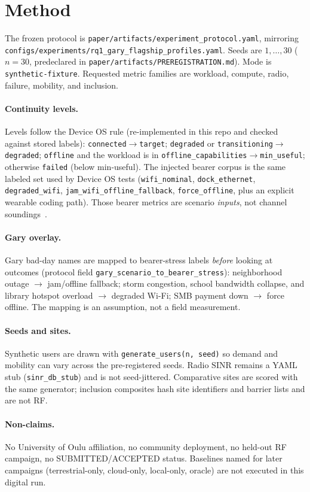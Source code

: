 \section{Method}
\label{sec:method}
The frozen protocol is \texttt{paper/artifacts/experiment\_protocol.yaml}, mirroring \texttt{configs/experiments/rq1\_gary\_flagship\_profiles.yaml}.
Seeds are $1,\dots,30$ ($n{=}30$, predeclared in \texttt{paper/artifacts/PREREGISTRATION.md}). Mode is \texttt{synthetic-fixture}.
Requested metric families are workload, compute, radio, failure, mobility, and inclusion.

\paragraph{Continuity levels.}
Levels follow the Device OS rule (re-implemented in this repo and checked against stored labels):
\texttt{connected}$\rightarrow$\texttt{target};
\texttt{degraded} or \texttt{transitioning}$\rightarrow$\texttt{degraded};
\texttt{offline} and the workload is in \texttt{offline\_capabilities}$\rightarrow$\texttt{min\_useful};
otherwise \texttt{failed} (below min-useful).
The injected bearer corpus is the same labeled set used by Device OS tests (\texttt{wifi\_nominal}, \texttt{dock\_ethernet}, \texttt{degraded\_wifi}, \texttt{jam\_wifi\_offline\_fallback}, \texttt{force\_offline}, plus an explicit wearable coding path).
Those bearer metrics are scenario \emph{inputs}, not channel soundings~\cite{itur_m2160}.

\paragraph{Gary overlay.}
Gary bad-day names are mapped to bearer-stress labels \emph{before} looking at outcomes (protocol field \texttt{gary\_scenario\_to\_bearer\_stress}):
neighborhood outage $\rightarrow$ jam/offline fallback;
storm congestion, school bandwidth collapse, and library hotspot overload $\rightarrow$ degraded Wi-Fi;
SMB payment down $\rightarrow$ force offline.
The mapping is an assumption, not a field measurement.

\paragraph{Seeds and sites.}
Synthetic users are drawn with \texttt{generate\_users(n, seed)} so demand and mobility can vary across the pre-registered seeds.
Radio $\mathrm{SINR}$ remains a YAML stub (\texttt{sinr\_db\_stub}) and is not seed-jittered.
Comparative sites are scored with the same generator; inclusion composites hash site identifiers and barrier lists and are not RF.

\paragraph{Non-claims.}
No University of Oulu affiliation, no community deployment, no held-out RF campaign, no SUBMITTED/ACCEPTED status.
Baselines named for later campaigns (terrestrial-only, cloud-only, local-only, oracle) are not executed in this digital run.
